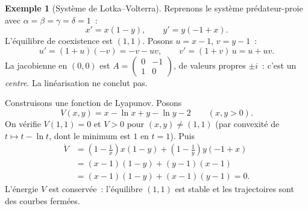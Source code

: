 \documentclass[12pt,a4paper,openany]{book}
\theoremstyle{definition}
\newtheorem{exemple}[definition]{Exemple}
\theoremstyle{plain}
\theoremstyle{remark}
\begin{document}
\begin{exemple}[Système de Lotka--Volterra]\label{ex:stab-lotka}
  Reprenons le système prédateur-proie avec $\alpha=\beta=\gamma=\delta=1$~:
  \[
    x'=x(1-y), \qquad y'=y(-1+x).
  \]
  L'équilibre de coexistence est $(1,1)$. Posons $u=x-1$, $v=y-1$~:
  \[
    u'=(1+u)(-v)=-v-uv, \qquad v'=(1+v)\,u=u+uv.
  \]
  La jacobienne en $(0,0)$ est
  $A=\begin{pmatrix}0&-1\\1&0\end{pmatrix}$, de valeurs propres
  $\pm i$~: c'est un \emph{centre}. La linéarisation ne conclut pas.

  Construisons une fonction de Lyapunov. Posons
  \[
    V(x,y)=x-\ln x+y-\ln y-2 \qquad (x,y>0).
  \]
  On vérifie $V(1,1)=0$ et $V>0$ pour $(x,y)\neq(1,1)$ (par convexité
  de $t\mapsto t-\ln t$, dont le minimum est $1$ en $t=1$). Puis
  \begin{align*}
    \dot{V}&=\left(1-\frac{1}{x}\right)x(1-y)
            +\left(1-\frac{1}{y}\right)y(-1+x) \\
           &=(x-1)(1-y)+(y-1)(x-1) \\
           &=(x-1)(1-y)+(x-1)(y-1)=0.
  \end{align*}
  L'énergie $V$ est conservée~: l'équilibre $(1,1)$ est stable et les
  trajectoires sont des courbes fermées.
\end{exemple}
\end{document}
